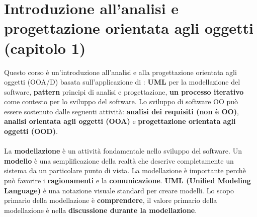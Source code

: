 \documentclass{article}
\numberwithin{equation}{subsection}
\begin{document}
\section{Introduzione all'analisi e progettazione orientata agli oggetti (capitolo 1)}
Questo corso è un'introduzione all'analisi e alla progettazione orientata agli oggetti (OOA/D) basata sull'applicazione di : \textbf{UML} per la modellazione del software, \textbf{pattern} principi di analisi e progettazione, \textbf{un processo iterativo} come contesto per lo sviluppo del software. Lo sviluppo di software OO può essere sostenuto dalle seguenti attività: \textbf{analisi dei requisiti (non è OO)}, \textbf{analisi orientata agli oggetti (OOA)} e \textbf{progettazione orientata agli oggetti (OOD)}.\\\\
La \textbf{modellazione} è un attività fondamentale nello sviluppo del software. Un \textbf{modello} è una semplificazione della realtà che descrive completamente un sistema da un particolare punto di vista. La modellazione è importante perchè può favorire i \textbf{ragionamenti} e la \textbf{comunicazione}. \textbf{UML (Unified Modeling Language)} è una notazione visuale standard per creare modelli. Lo scopo primario della modellazione è \textbf{comprendere}, il valore primario della modellazione è nella \textbf{discussione durante la modellazione}. \\\\
\end{document}
